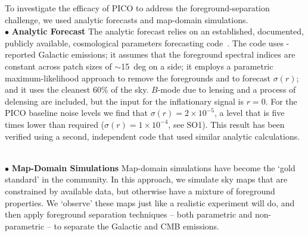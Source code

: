 \documentclass[PICOReport.tex]{subfiles}
\begin{document}
To investigate the efficacy of PICO to address the foreground-separation challenge, we used analytic forecasts and map-domain simulations. \\ 
%
\noindent$\bullet$ {\bf Analytic Forecast} \hspace{0.1in} The analytic forecast relies on an established, documented, publicly available, cosmological parameters forecasting code~\citep{errard_and_finney}.  The code uses \planck -reported Galactic emissions; it assumes that the foreground spectral indices are constant across patch sizes of $\sim$15~deg on a side; it employs a parametric maximum-likelihood approach to remove the foregrounds and to forecast $\sigma(r)$; and it uses the cleanest 60\% of the sky. $B$-mode due to lensing and a process of delensing are included, but the input for the inflationary signal is $r=0$. For the PICO baseline noise levels we find that $\sigma(r) = 2\times 10^{-5}$, a level that is five times lower than required ($\sigma(r) =1 \times 10^{-4}$, see SO1). This result has been verified using a second, independent code that used similar analytic calculations.  

  \\
%
\noindent$\bullet$ {\bf Map-Domain Simulations} \hspace{0.1in} Map-domain simulations have become the `gold standard' in the community. In this approach, we simulate sky maps that are constrained by available data, but otherwise have a mixture of foreground properties. We `observe' these maps just like a realistic experiment will do, and then apply foreground separation techniques -- both parametric and non-parametric -- to separate the Galactic and CMB emissions. 
\end{document}
